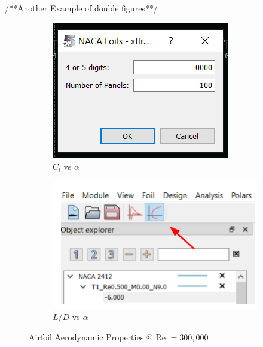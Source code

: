 /**Another Example of double figures**/ \\
 \begin{figure}[H]
            \centering
            \begin{subfigure}{.49\textwidth}
                \includegraphics[width=\textwidth]{Images/NACA foils.PNG}
                \caption{$C_l$ vs $\alpha$}
            \end{subfigure}
            \hspace{\fill}
            \begin{subfigure}{.49\textwidth}
                \includegraphics[width=\textwidth]{Images/polar view.png}
                \caption{$L/D$ vs $\alpha$}
            \end{subfigure}
            \caption{Airfoil Aerodynamic Properties @ Re $= 300,000$}
            \label{fig:foilprops}
        \end{figure}

